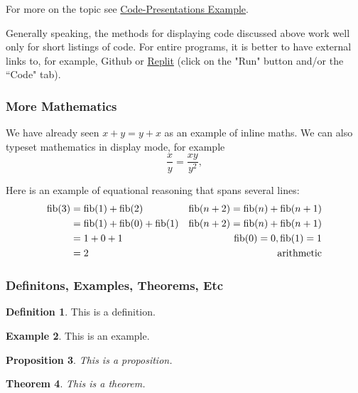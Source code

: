 \documentclass{article}
\theoremstyle{theorem}
\newtheorem{theorem}{Theorem}[section]
\newtheorem{proposition}[theorem]{Proposition}
\theoremstyle{definition}
\newtheorem{definition}[theorem]{Definition}
\newtheorem{example}[theorem]{Example}
\theoremstyle{remark}
\begin{document}
\noindent
For more on the topic see \href{https://www.overleaf.com/latex/examples/code-presentations-example-different-ways-shown-in-beamer-metropolis/tsxpnyjbhbds}{Code-Presentations Example}.

\medskip\noindent
Generally speaking,  the methods for displaying code discussed above work well only for short listings of code. For entire programs, it is better to have external links to, for example, Github or \href{https://replit.com/@alexhkurz/automata01#main.hs}{Replit} (click on the "Run" button and/or the ``Code" tab).

\subsubsection{More Mathematics}

We have already seen $x+y=y+x$ as an example of inline maths. We can also typeset mathematics in display mode, for example
$$\frac x y =\frac{xy}{y^2},$$

\noindent
Here is an example of equational reasoning that spans several lines:
\begin{align*}
{\rm fib}(3)
& = {\rm fib}(1) +{\rm fib}(2)  & {\rm fib}(n+2) = {\rm fib}(n)  + {\rm fib}(n+1) \\
& = {\rm fib}(1) +{\rm fib}(0)  + {\rm fib}(1) & {\rm fib}(n+2) = {\rm fib}(n)  + {\rm fib}(n+1) \\
& = 1 + 0  +1 & {\rm fib}(0) = 0,   {\rm fib}(1) = 1\\
& = 2 & {\rm arithmetic}
\end{align*}

\subsubsection{Definitons, Examples, Theorems, Etc}

\begin{definition} 
This is a definition.
\end{definition}

\begin{example}
This is an example.
\end{example}

\begin{proposition}
This is a proposition.
\end{proposition}

\begin{theorem}
This is a theorem.
\end{theorem}
\end{document}
